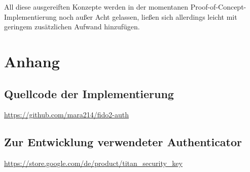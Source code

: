 \documentclass[journal]{IEEEtran}
\begin{document}
All diese ausgereiften Konzepte werden in der momentanen
Proof-of-Concept-Implementierung noch außer Acht gelassen, ließen sich
allerdings leicht mit geringem zusätzlichen Aufwand hinzufügen.

\listoffigures




\section*{Anhang}

\subsection*{Quellcode der Implementierung}

\url{https://github.com/mara214/fido2-auth}

\subsection*{Zur Entwicklung verwendeter Authenticator}

\url{https://store.google.com/de/product/titan_security_key}
\end{document}
